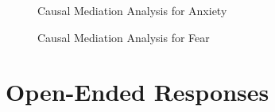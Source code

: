 \documentclass[]{article}
\begin{document}
\begin{figure}[H]
\caption{Causal Mediation Analysis for Anxiety}\vspace{.5em}
\centering
\vspace{2em}

\end{figure}

\begin{figure}[H]
\caption{Causal Mediation Analysis for Fear}\vspace{.5em}
\centering
\vspace{2em}

\end{figure}

\section{Open-Ended Responses}



\end{document}
